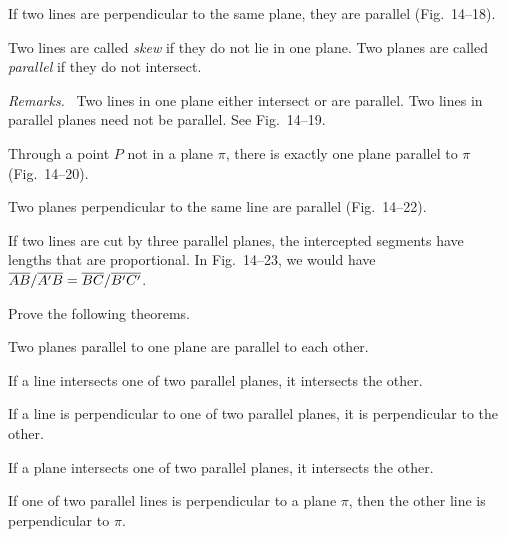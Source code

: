 \documentclass[11pt]{book}
\newenvironment{XIVremarks}{\par\medskip\noindent\emph{Remarks.}\ }%
  {\par\medskip}
\begin{document}
\begin{theorem}
If two lines are perpendicular to the same plane, they are parallel
(Fig.~14--18).
\end{theorem}


\FIGXIVSEVENTEENEIGHTEEN

\begin{definition}
Two lines are called \emph{skew} if they do not lie in one plane. Two planes are
called \emph{parallel} if they do not intersect.
\end{definition}

\begin{XIVremarks}
Two lines in one plane either intersect or are parallel. Two lines in parallel
planes need not be parallel. See Fig.~14--19.
\end{XIVremarks}

\FIGXIVNINETEEN

\begin{theorem}
Through a point $P$ not in a plane $\pi$, there is exactly one plane parallel to
$\pi$ (Fig.~14--20).
\end{theorem}


\begin{theorem}
Two planes perpendicular to the same line are parallel (Fig.~14--22).
\end{theorem}

\FIGXIVTWENTYTWENTYTWO

\begin{theorem}
If two lines are cut by three parallel planes, the intercepted segments have
lengths that are proportional. In Fig.~14--23, we would have
$\overline{AB}/\overline{A'B} = \overline{BC}/\overline{B'C'}$.
\end{theorem}

\FIGXIVTWENTYTHREE

Prove the following theorems.
\begin{exercisecols}
\begin{exlist}
\item Two planes parallel to one plane are parallel to each other.
\item If a line intersects one of two parallel planes, it intersects the other.
\item If a line is perpendicular to one of two parallel planes, it is
      perpendicular to the other.
\item If a plane intersects one of two parallel planes, it intersects the other.
\item If one of two parallel lines is perpendicular to a plane $\pi$, then the
      other line is perpendicular to $\pi$.
\end{exlist}
\end{exercisecols}
\end{document}
